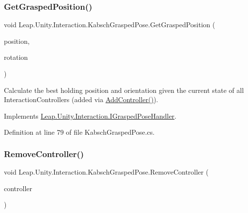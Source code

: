 \subsubsection{\texorpdfstring{GetGraspedPosition()}{GetGraspedPosition()}}
{\footnotesize\ttfamily void Leap.\+Unity.\+Interaction.\+Kabsch\+Grasped\+Pose.\+Get\+Grasped\+Position (\begin{DoxyParamCaption}\item[{out Vector3}]{position,  }\item[{out Quaternion}]{rotation }\end{DoxyParamCaption})}



Calculate the best holding position and orientation given the current state of all Interaction\+Controllers (added via \mbox{\hyperlink{class_leap_1_1_unity_1_1_interaction_1_1_kabsch_grasped_pose_a48e190a6d9cadcaf3340d339ac61d464}{Add\+Controller()}}). 



Implements \mbox{\hyperlink{interface_leap_1_1_unity_1_1_interaction_1_1_i_grasped_pose_handler_a5721a16b0e8e2f8715edfad605931638}{Leap.\+Unity.\+Interaction.\+I\+Grasped\+Pose\+Handler}}.



Definition at line 79 of file Kabsch\+Grasped\+Pose.\+cs.

\mbox{\label{class_leap_1_1_unity_1_1_interaction_1_1_kabsch_grasped_pose_a661d3ea1067114b90addbc885691c899}} 
\subsubsection{\texorpdfstring{RemoveController()}{RemoveController()}}
{\footnotesize\ttfamily void Leap.\+Unity.\+Interaction.\+Kabsch\+Grasped\+Pose.\+Remove\+Controller (\begin{DoxyParamCaption}\item[{\mbox{\hyperlink{class_leap_1_1_unity_1_1_interaction_1_1_interaction_controller}{Interaction\+Controller}}}]{controller }\end{DoxyParamCaption})}



